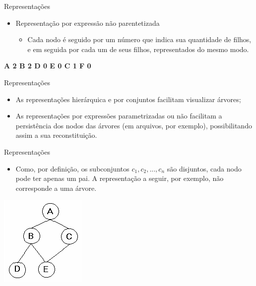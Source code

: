 \documentclass[12pt,table,xcolor={dvipsnames}]{beamer}
\begin{document}
\begin{frame}[fragile]{Representações}
\begin{itemize}
\item Representação por expressão	não parentetizada
\begin{itemize}
\item  Cada nodo é seguido por um número que indica sua quantidade de filhos, e em seguida por cada um de seus filhos, representados do mesmo modo.
\end{itemize}
\end{itemize}
\begin{center}
\textbf{A 2 \color{red} B 2 \color{blue} D 0 E 0 \color{red} C 1 \color{blue} F 0} 
\end{center}
\end{frame}

\begin{frame}[fragile]{Representações}
\begin{itemize}
\item As representações hierárquica e por conjuntos facilitam visualizar árvores; 
\item As representações por expressões parametrizadas ou não facilitam a persistência dos nodos das árvores (em arquivos, por exemplo), possibilitando assim a sua reconstituição.
\end{itemize}
\end{frame}

\begin{frame}[fragile]{Representações}
          \begin{itemize}
		  \item Como, por definição, os subconjuntos $c_1, c_2, ..., c_n$ são disjuntos, cada nodo pode ter apenas um pai. A representação a seguir, por exemplo, não corresponde a uma árvore.
          \end{itemize}
          \begin{center}
          \includegraphics[scale=.75]{grafo.png} 
          \end{center}
\end{frame} 
\end{document}
